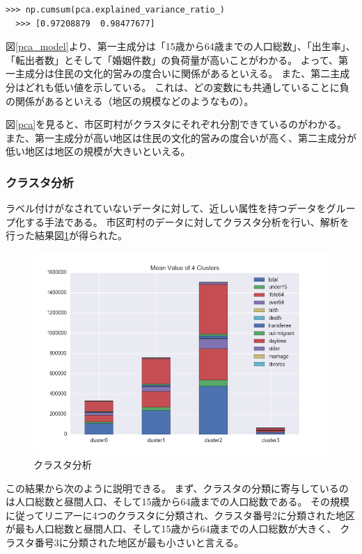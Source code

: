 \documentclass[a4paper,xelatex,ja=standard,jafont=hiragino-pron, 10pt]{bxjsarticle}
\begin{document}
\begin{lstlisting}[caption=累積寄与率, frame=single]
  >>> np.cumsum(pca.explained_variance_ratio_)
  >>> [0.97208879  0.98477677]
\end{lstlisting}

図\ref{pca_model}より、第一主成分は「15歳から64歳までの人口総数」、「出生率」、「転出者数」とそして「婚姻件数」の負荷量が高いことがわかる。
よって、第一主成分は住民の文化的営みの度合いに関係があるといえる。
また、第二主成分はどれも低い値を示している。
これは、どの変数にも共通していることに負の関係があるといえる（地区の規模などのようなもの）。

図\ref{pca}を見ると、市区町村がクラスタにそれぞれ分割できているのがわかる。
また、第一主成分が高い地区は住民の文化的営みの度合いが高く、第二主成分が低い地区は地区の規模が大きいといえる。

\subsubsection{クラスタ分析}

ラベル付けがなされていないデータに対して、近しい属性を持つデータをグループ化する手法である。
市区町村のデータに対してクラスタ分析を行い、解析を行った結果図\ref{clustering}が得られた。

\begin{figure}[ht]
  \centering
  \includegraphics[clip, width=15cm]{../data/picture/clustering.png}
  \caption{クラスタ分析}
  \label{clustering}
\end{figure}

この結果から次のように説明できる。
まず、クラスタの分類に寄与しているのは人口総数と昼間人口、そして15歳から64歳までの人口総数である。
その規模に従ってリニアーに4つのクラスタに分類され、クラスタ番号2に分類された地区が最も人口総数と昼間人口、そして15歳から64歳までの人口総数が大きく、
クラスタ番号3に分類された地区が最も小さいと言える。
\end{document}

